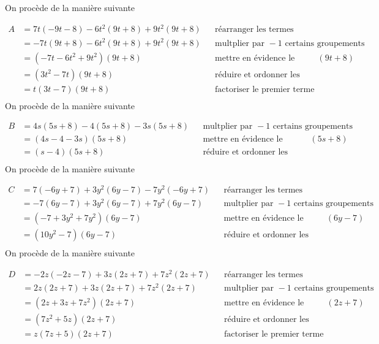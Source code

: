 \documentclass[a4paper,12pt]{report}
\begin{document}
\begin{cora}\phantom{ }

\begin{tasks}
\task On procède de la manière suivante 

\medskip
 $\begin{aligned}A&=7 t(-9 t-8 )-6 t^2(9 t + 8 )+9 t^2(9 t + 8 )&&\text{réarranger les termes}\\&=-7 t(9 t + 8 )-6 t^2(9 t + 8 )+9 t^2(9 t + 8 )&&\text{multplier par } -1 \text{ certains groupements}\\&=(-7 t-6 t^2 + 9 t^2)(9 t + 8 )&& \text{mettre en évidence le facteur } (9 t + 8 )\\&=(3 t^2-7 t)(9 t + 8 ) && \text{réduire et ordonner les facteurs}\\&={{t(3 t-7 )(9 t + 8 )}}&& \text{factoriser le premier terme}\\\end{aligned}$
\task On procède de la manière suivante 

\medskip
 $\begin{aligned}B&=4 s(5 s + 8 )-4 (5 s + 8 )-3 s(5 s + 8 )&&\text{multplier par } -1 \text{ certains groupements}\\&=(4 s-4 -3 s)(5 s + 8 )&& \text{mettre en évidence le facteur } (5 s + 8 )\\&={{(s-4 )(5 s + 8 )}}&& \text{réduire et ordonner les facteurs}\\\end{aligned}$
\task On procède de la manière suivante 

\medskip
 $\begin{aligned}C&=7 (-6 y + 7 )+3 y^2(6 y-7 )-7 y^2(-6 y + 7 )&&\text{réarranger les termes}\\&=-7 (6 y-7 )+3 y^2(6 y-7 )+7 y^2(6 y-7 )&&\text{multplier par } -1 \text{ certains groupements}\\&=(-7  + 3 y^2 + 7 y^2)(6 y-7 )&& \text{mettre en évidence le facteur } (6 y-7 )\\&={{(10 y^2-7 )(6 y-7 )}}&& \text{réduire et ordonner les facteurs}\\\end{aligned}$
\task On procède de la manière suivante 

\medskip
 $\begin{aligned}D&=-2 z(-2 z-7 )+3 z(2 z + 7 )+7 z^2(2 z + 7 )&&\text{réarranger les termes}\\&=2 z(2 z + 7 )+3 z(2 z + 7 )+7 z^2(2 z + 7 )&&\text{multplier par } -1 \text{ certains groupements}\\&=(2 z + 3 z + 7 z^2)(2 z + 7 )&& \text{mettre en évidence le facteur } (2 z + 7 )\\&=(7 z^2 + 5 z)(2 z + 7 ) && \text{réduire et ordonner les facteurs}\\&={{z(7 z + 5 )(2 z + 7 )}}&& \text{factoriser le premier terme}\\\end{aligned}$
\end{tasks}

\end{cora}
\end{document}
